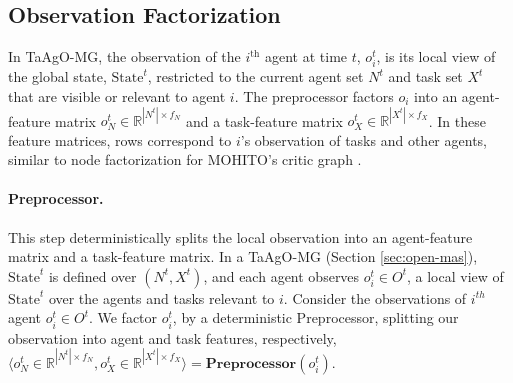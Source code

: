 \subsection{Observation Factorization}\label{factorization}  In TaAgO-MG, the observation of the $i^{\text{th}}$ agent at time $t$, $o_i^t$, is its local view of the global state, $\mathrm{State}^t$, restricted to the current agent set $N^t$ and task set $X^t$ that are visible or relevant to agent $i$.  
The preprocessor factors $o_i$ into an agent-feature matrix $o_N^t \in \mathbb{R}^{|N^t|\times f_N}$ and a task-feature matrix $o_X^t \in \mathbb{R}^{|X^t|\times f_X}$. In these feature matrices, rows correspond to $i$'s observation of tasks and other agents, similar to node factorization for MOHITO's critic graph \cite{anilmohito}. 


\paragraph{Preprocessor.}\label{actor:preprocessor}
This step deterministically splits the local observation into an agent-feature matrix and a task-feature matrix. 
In a TaAgO-MG (Section \ref{sec:open-mas}), $\text{State}^t$ is defined over $(N^t,X^t)$, and each agent observes $o_i^t \in O^t$, a local view of $\text{State}^t$ over the agents and tasks relevant to $i$.
Consider the observations of $i^{th}$ agent $o_i^t \in O^t$. We factor $o_i^t$, by a deterministic Preprocessor, splitting our observation into agent and task features, respectively, $\label{eq:preproc}
    \langle o^t_N \in \mathbb{R}^{|N^t|\times f_N},o^t_X \in \mathbb{R}^{|X^t|\times f_X}\rangle = \textbf{Preprocessor}(o_i^t)$.


